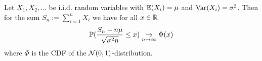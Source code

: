 \begin{theorem*}
  Let \(X_1, X_2, \ldots\) be i.i.d. random variables with \(\E(X_i) = \mu\) and \(\Var(X_i) = \sigma^2\). Then for the sum \(S_n := \sum_{i=1}^n X_i\) we have for all \(x \in \R\)
  \[\P(\frac{S_n - n \mu}{\sqrt{\sigma^2n}} \leq x) \underset{n \to \infty}{\to} \Phi(x)\]
  where \(\Phi\) is the CDF of the \(\Normal(0, 1)\)-distribution.
\end{theorem*}
